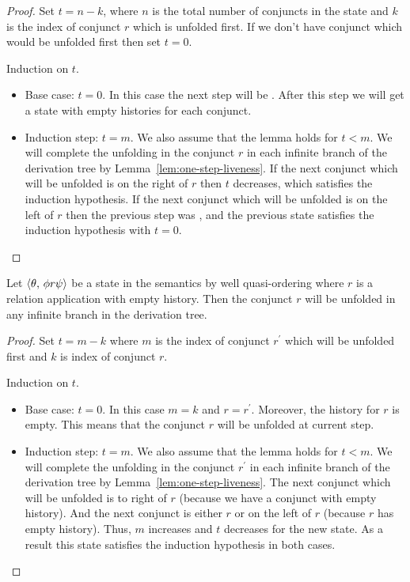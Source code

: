 \begin{proof}
  Set $t = n - k$, where $n$ is the total number of conjuncts in the state and $k$ is the index of conjunct $r$ which is unfolded first.
  If we don't have conjunct which would be unfolded first then set $t = 0$.

  Induction on $t$.
          
 \begin{itemize}
    \item Base case: $t = 0$.      
          In this case the next step will be . After this step we will get a state with empty histories for each conjunct.
    \item Induction step: $t = m$. We also assume that the lemma holds for $t < m$.
          We will complete the unfolding in the conjunct $r$ in each infinite branch of the derivation tree by Lemma~\ref{lem:one-step-liveness}.
          If the next conjunct which will be unfolded is on the right of $r$ then $t$ decreases, which satisfies the induction hypothesis. If the next
          conjunct which will be unfolded is on the left of $r$ then the previous step was , and the previous state satisfies the
          induction hypothesis with $t = 0$.
 \end{itemize}
\end{proof}

\begin{lemma}
  \label{lem:empty-stories-liveness}
  Let $\langle \theta,\, \phi r \psi \rangle$ be a state in the semantics by well quasi-ordering where $r$ is a relation application
  with empty history. Then the conjunct $r$ will be unfolded in any infinite branch in the derivation tree.
\end{lemma}

\begin{proof}
 Set $t = m - k$ where $m$ is the index of conjunct $r^\prime$ which will be unfolded first and $k$ is index of conjunct $r$.

Induction on $t$.

\begin{itemize}
    \item Base case: $t = 0$. In this case $m = k$ and $r = r^\prime$. Moreover, the history for $r$ is empty. This means that the conjunct $r$ will
    be unfolded at current step.
    \item Induction step: $t = m$. We also assume that the lemma holds for $t < m$.
    We will complete the unfolding in the conjunct $r^\prime$ in each infinite branch of the derivation tree by Lemma~\ref{lem:one-step-liveness}.
    The next conjunct which will be unfolded is to right of $r$ (because we have a conjunct with empty history). And the next conjunct is either $r$ or
    on the left of $r$ (because $r$ has empty history). Thus, $m$ increases and $t$ decreases for the new state. As a result this state satisfies
    the induction hypothesis in both cases.
\end{itemize}
\end{proof}


